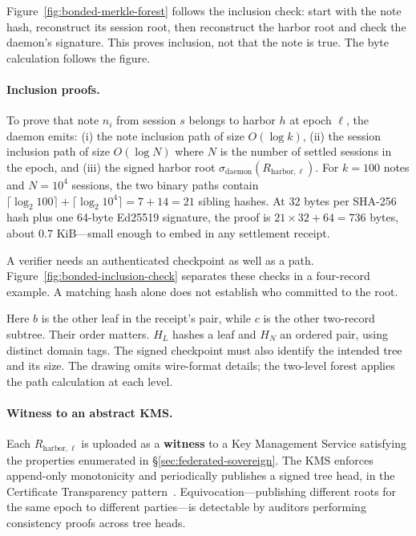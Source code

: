 \documentclass[11pt,a4paper]{article}
\theoremstyle{definition}
\theoremstyle{remark}
\begin{document}
Figure~\ref{fig:bonded-merkle-forest} follows the inclusion check: start with
the note hash, reconstruct its session root, then reconstruct the harbor root
and check the daemon's signature. This proves inclusion, not that the note is
true. The byte calculation follows the figure.



\paragraph{Inclusion proofs.} To prove that note $n_i$ from session $s$ belongs to harbor $h$ at epoch $\ell$, the daemon emits: (i) the note inclusion path of size $O(\log k)$, (ii) the session inclusion path of size $O(\log N)$ where $N$ is the number of settled sessions in the epoch, and (iii) the signed harbor root $\sigma_{\text{daemon}}(R_{\text{harbor},\ell})$. For $k=100$ notes and $N=10^{4}$ sessions, the two binary paths contain $\lceil\log_2 100\rceil+\lceil\log_2 10^4\rceil=7+14=21$ sibling hashes. At 32 bytes per SHA-256 hash plus one 64-byte Ed25519 signature, the proof is $21\times32+64=736$ bytes, about $0.7$ KiB---small enough to embed in any settlement receipt.

A verifier needs an authenticated checkpoint as well as a path.
Figure~\ref{fig:bonded-inclusion-check} separates these checks in a four-record
example. A matching hash alone does not establish who committed to the root.



Here $b$ is the other leaf in the receipt's pair, while $c$ is the other
two-record subtree. Their order matters. $H_L$ hashes a leaf and $H_N$ an
ordered pair, using distinct domain tags. The signed checkpoint must also
identify the intended tree and its size. The drawing omits wire-format
details; the two-level forest applies the path calculation at each level.

\paragraph{Witness to an abstract KMS.} Each $R_{\text{harbor},\ell}$ is uploaded as a \textbf{witness} to a Key Management Service satisfying the properties enumerated in \S\ref{sec:federated-sovereign}. The KMS enforces append-only monotonicity and periodically publishes a signed tree head, in the Certificate Transparency pattern~. Equivocation---publishing different roots for the same epoch to different parties---is detectable by auditors performing consistency proofs across tree heads.
\end{document}
